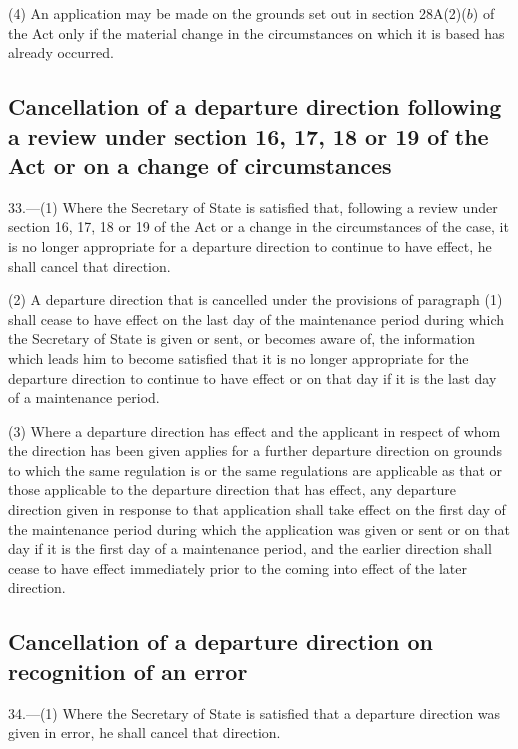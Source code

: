\documentclass[a4paper]{article}
\begin{document}
(4) An application may be made on the grounds set out in section 28A(2)($b$) of the Act only if the material change in the circumstances on which it is based has already occurred.

\subsection[33. Cancellation of a departure direction following a review under section 16, 17, 18 or 19 of the Act or on a change of circumstances]{Cancellation of a departure direction following a review under section 16, 17, 18 or 19 of the Act or on a change of circumstances}

33.—(1) Where the Secretary of State is satisfied that, following a review under section 16, 17, 18 or 19 of the Act or a change in the circumstances of the case, it is no longer appropriate for a departure direction to continue to have effect, he shall cancel that direction.

(2) A departure direction that is cancelled under the provisions of paragraph (1) shall cease to have effect on the last day of the maintenance period during which the Secretary of State is given or sent, or becomes aware of, the information which leads him to become satisfied that it is no longer appropriate for the departure direction to continue to have effect or on that day if it is the last day of a maintenance period.

(3) Where a departure direction has effect and the applicant in respect of whom the direction has been given applies for a further departure direction on grounds to which the same regulation is or the same regulations are applicable as that or those applicable to the departure direction that has effect, any departure direction given in response to that application shall take effect on the first day of the maintenance period during which the application was given or sent or on that day if it is the first day of a maintenance period, and the earlier direction shall cease to have effect immediately prior to the coming into effect of the later direction.

\subsection[34. Cancellation of a departure direction on recognition of an error]{Cancellation of a departure direction on recognition of an error}

34.—(1) Where the Secretary of State is satisfied that a departure direction was given in error, he shall cancel that direction.
\end{document}
